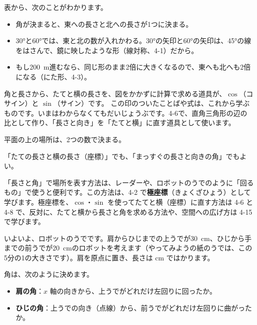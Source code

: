 表から、次のことがわかります。
\begin{itemize}[leftmargin=1.2\zw, itemsep=2pt, topsep=2pt, label={\color{bkTheme!80!black}●}]
\item 角が決まると、東への長さと北への長さが1つに決まる。
\item 30°と60°では、東と北の数が入れかわる。30°の矢印と60°の矢印は、45°の線をはさんで、鏡に映したような形（線対称、4-1）だから。
\item もし\qty{200}{m}進むなら、同じ形のまま2倍に大きくなるので、東へも北へも2倍になる（にた形、4-3）。
\end{itemize}

角と長さから、たてと横の長さを、図をかかずに計算で求める道具が、$\cos$（コサイン）と $\sin$（サイン）です。\bkivakore\enspace
この印のついたことばや式は、これから学ぶものです。いまはわからなくてもだいじょうぶです。4-6で、直角三角形の辺の比として作り、「長さと向き」を「たてと横」に直す道具として使います。

\begin{taisetsu}
平面の上の場所は、2つの数で決まる。\par
「たての長さと横の長さ（座標）」でも、「まっすぐの長さと向きの角」でもよい。
\end{taisetsu}

「長さと角」で場所を表す方法は、レーダーや、ロボットのうでのように「回るもの」で使うと便利です。この方法は、4-2 で\textbf{極座標}（きょくざひょう）として学びます。極座標を、$\cos$・$\sin$ を使ってたてと横（座標）に直す方法は 4-6 と 4-8 で、反対に、たてと横から長さと角を求める方法や、空間への広げ方は 4-15 で学びます。



\label{bk:4-0:jun}いよいよ、ロボットのうでです。肩からひじまでの上うでが\qty{30}{cm}、ひじから手までの前うでが\qty{20}{cm}のロボットを考えます（やってみようの紙のうでは、この5分の1の大きさです）。肩を原点に置き、長さは cm ではかります。

角は、次のように決めます。
\begin{itemize}[leftmargin=1.2\zw, itemsep=2pt, topsep=2pt, label={\color{bkTheme!80!black}●}]
\item \textbf{肩の角}：$x$ 軸の向きから、上うでがどれだけ左回りに回ったか。
\item \textbf{ひじの角}：上うでの向き（点線）から、前うでがどれだけ左回りに曲がったか。
\end{itemize}

